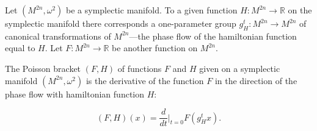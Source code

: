 Let $(M^{2n}, \omega^2)$ be a symplectic manifold. To a given function $H: M^{2n} \to \mathbb{R}$ on the symplectic manifold there corresponds a one-parameter group $g_H^t: M^{2n} \to M^{2n}$ of canonical transformations of $M^{2n}$---the phase flow of the hamiltonian function equal to $H$. Let $F: M^{2n} \to \mathbb{R}$ be another function on $M^{2n}$.

The Poisson bracket $(F, H)$ of functions $F$ and $H$ given on a symplectic manifold $(M^{2n}, \omega^2)$ is the derivative of the function $F$ in the direction of the phase flow with hamiltonian function $H$:

$$(F, H)(x) = \frac{d}{dt}\bigg|_{t=0} F(g_H^t x).$$
